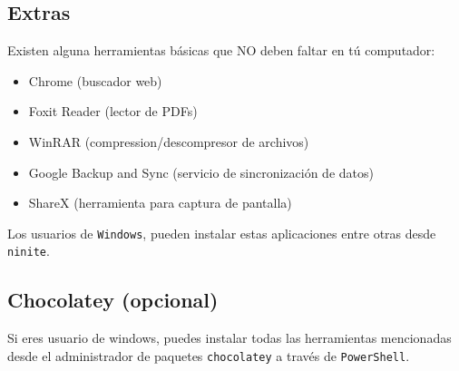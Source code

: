 \subsection{Extras}\label{extras}

Existen alguna herramientas básicas que NO deben faltar en tú computador:

\begin{itemize}
\tightlist
\item
  Chrome (buscador web)
\item
  Foxit Reader (lector de PDFs)
\item
  WinRAR (compression/descompresor de archivos)
\item
  Google Backup and Sync (servicio de sincronización de datos)
\item
  ShareX (herramienta para captura de pantalla)
\end{itemize}

Los usuarios de \texttt{Windows}, pueden instalar estas aplicaciones entre otras desde \texttt{ninite}.

\subsection{Chocolatey (opcional)}\label{chocolatey-opcional}

Si eres usuario de windows, puedes instalar todas las herramientas mencionadas desde el administrador de paquetes \texttt{chocolatey} a través de \texttt{PowerShell}.

\begin{Shaded}
\begin{Highlighting}[]
\SpecialCharTok{:}\ErrorTok{//}\SpecialCharTok{/}

\SpecialCharTok{{-}}\SpecialCharTok{{-}}

\SpecialCharTok{{-}}\SpecialCharTok{{-}}\SpecialCharTok{{-}}\SpecialCharTok{::}\OtherTok{=}\SpecialCharTok{::}\SpecialCharTok{{-}}\NormalTok{; }\SpecialCharTok{{-}}\NormalTok{(}\NormalTok{))}

\SpecialCharTok{{-}}\SpecialCharTok{{-}}\SpecialCharTok{{-}}
\end{Highlighting}
\end{Shaded}

